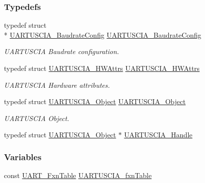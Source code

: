 \subsubsection*{Typedefs}
\begin{DoxyCompactItemize}
\item 
typedef struct \\*
\hyperlink{struct_u_a_r_t_u_s_c_i_a___baudrate_config}{U\-A\-R\-T\-U\-S\-C\-I\-A\-\_\-\-Baudrate\-Config} \hyperlink{_u_a_r_t_u_s_c_i_a_8h_a9dd05c71b8c01f08e0e7a3d244b979a5}{U\-A\-R\-T\-U\-S\-C\-I\-A\-\_\-\-Baudrate\-Config}
\begin{DoxyCompactList}\small\item\em U\-A\-R\-T\-U\-S\-C\-I\-A Baudrate configuration. \end{DoxyCompactList}\item 
typedef struct \hyperlink{struct_u_a_r_t_u_s_c_i_a___h_w_attrs}{U\-A\-R\-T\-U\-S\-C\-I\-A\-\_\-\-H\-W\-Attrs} \hyperlink{_u_a_r_t_u_s_c_i_a_8h_ae0df79ea0be8c2a982879d4ca96640b6}{U\-A\-R\-T\-U\-S\-C\-I\-A\-\_\-\-H\-W\-Attrs}
\begin{DoxyCompactList}\small\item\em U\-A\-R\-T\-U\-S\-C\-I\-A Hardware attributes. \end{DoxyCompactList}\item 
typedef struct \hyperlink{struct_u_a_r_t_u_s_c_i_a___object}{U\-A\-R\-T\-U\-S\-C\-I\-A\-\_\-\-Object} \hyperlink{_u_a_r_t_u_s_c_i_a_8h_ada23da6b4e4cb68cc02b428572a35039}{U\-A\-R\-T\-U\-S\-C\-I\-A\-\_\-\-Object}
\begin{DoxyCompactList}\small\item\em U\-A\-R\-T\-U\-S\-C\-I\-A Object. \end{DoxyCompactList}\item 
typedef struct \hyperlink{struct_u_a_r_t_u_s_c_i_a___object}{U\-A\-R\-T\-U\-S\-C\-I\-A\-\_\-\-Object} $\ast$ \hyperlink{_u_a_r_t_u_s_c_i_a_8h_a079d7343628e06c721baa22f08bdb5da}{U\-A\-R\-T\-U\-S\-C\-I\-A\-\_\-\-Handle}
\end{DoxyCompactItemize}
\subsubsection*{Variables}
\begin{DoxyCompactItemize}
\item 
const \hyperlink{struct_u_a_r_t___fxn_table}{U\-A\-R\-T\-\_\-\-Fxn\-Table} \hyperlink{_u_a_r_t_u_s_c_i_a_8h_a3ee66a5f5c9d9418c1aefea691f48c8a}{U\-A\-R\-T\-U\-S\-C\-I\-A\-\_\-fxn\-Table}
\end{DoxyCompactItemize}


